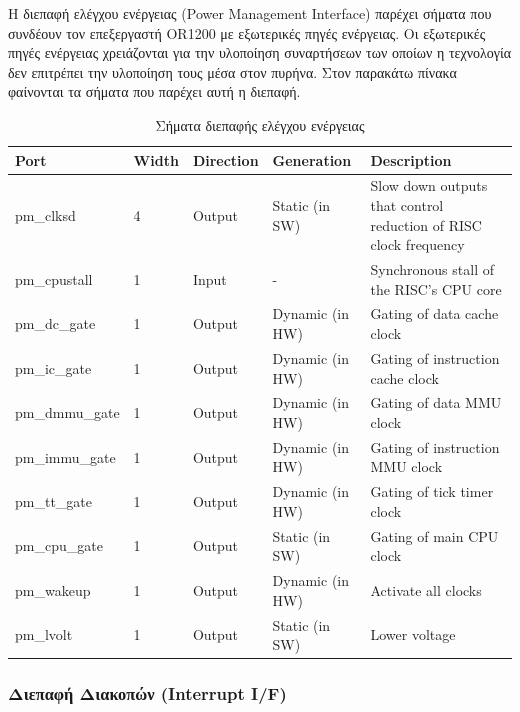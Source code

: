 \documentclass[a4paper,10pt]{article}
\numberwithin{figure}{section}
\numberwithin{table}{section}
\begin{document}
H διεπαφή ελέγχου ενέργειας (Power Management Interface) παρέχει σήματα που συνδέουν τον επεξεργαστή OR1200 με εξωτερικές πηγές ενέργειας. Οι εξωτερικές πηγές ενέργειας χρειάζονται για την υλοποίηση συναρτήσεων των οποίων η τεχνολογία δεν επιτρέπει την υλοποίηση τους μέσα στον πυρήνα. Στον παρακάτω πίνακα φαίνονται τα σήματα που παρέχει αυτή η διεπαφή.
{%
\vspace{0.7cm}
\renewcommand{\arraystretch}{1.2}
\setlength{\tabcolsep}{0.3em}
\newcommand{\mc}[3]{\multicolumn{#1}{#2}{#3}}
\begin{table}[h]
\begin{center}
\begin{tabular}{|l|l|l|l|p{6 cm}|}
\hline
\rowcolor{tcA}
Port & Width & Direction  & Generation & Description\\\hline
pm\_clksd & 4 & Output & Static (in SW) & Slow down outputs that control reduction of RISC clock frequency\\\hline
pm\_cpustall & 1 & Input & - & Synchronous stall of the RISC’s CPU core\\\hline
pm\_dc\_gate & 1 & Output & Dynamic (in HW) & Gating of data cache clock\\\hline
pm\_ic\_gate & 1 & Output & Dynamic (in HW) & Gating of instruction cache clock\\\hline
pm\_dmmu\_gate & 1 & Output & Dynamic (in HW) & Gating of data MMU clock\\\hline
pm\_immu\_gate & 1 & Output & Dynamic (in HW) & Gating of instruction MMU clock\\\hline
pm\_tt\_gate & 1 & Output & Dynamic (in HW) & Gating of tick timer clock\\\hline
pm\_cpu\_gate & 1 & Output & Static (in SW) & Gating of main CPU clock\\\hline
pm\_wakeup & 1 & Output & Dynamic (in HW) &  Activate all clocks\\\hline
pm\_lvolt & 1 & Output & Static (in SW) & Lower voltage\\\hline
\end{tabular}
\end{center}
\caption{Σήματα διεπαφής ελέγχου ενέργειας}
\end{table}
\vspace{0.7cm}
}%

\subsubsection{Διεπαφή Διακοπών (Interrupt I/F)}
\end{document}
